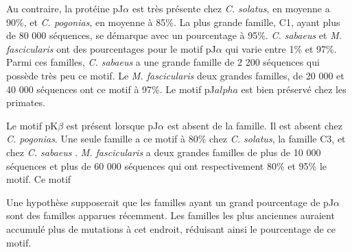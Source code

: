 \documentclass[12pt,a4paper]{article}
\begin{document}
			Au contraire, la protéine pJ$\alpha$ est très présente chez \textit{C. solatus}, en moyenne a 90\%, et \textit{C. pogonias}, en moyenne à 85\%. La plus grande famille, C1, ayant plus de 80 000 séquences, se démarque avec un pourcentage à  95\%. \textit{C. sabaeus} et \textit{M. fascicularis} ont des pourcentages pour le motif pJ$\alpha$ qui varie entre 1\% et 97\%. Parmi ces familles, \textit{C. sabaeus} a une grande famille de 2 200 séquences qui possède très peu ce motif. Le \textit{M. fascicularis} deux grandes familles, de 20 000 et 40 000 séquences ont ce motif à 97\%. Le motif pJ$alpha$ est bien préservé chez les primates.
			
			Le motif pK$\beta$ est présent lorsque pJ$\alpha$ est absent de la famille. Il est absent chez \textit{C. pogonias}. Une seule famille a ce motif à 80\% chez \textit{C. solatus}, la famille C3,  et chez \textit{C. sabaeus} . \textit{M. fascicularis} a deux grandes familles de plus de 10 000 séquences et plus de 60 000 séquences qui ont respectivement 80\% et 95\% le motif. Ce motif 
			
			Une hypothèse supposerait que les familles ayant un grand pourcentage de pJ$\alpha$ sont des familles apparues récemment. Les familles les plus anciennes auraient accumulé plus de mutations à cet endroit, réduisant ainsi le pourcentage de ce motif.
			
\end{document}
